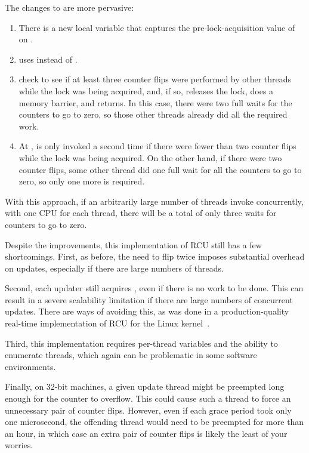 \begin{fcvref}
The changes to  are more pervasive:
\begin{enumerate}
\item	There is a new  local variable that captures
	the pre-lock-acquisition value of  on
	.
\item	{} uses  instead of .
\item	{} check to see if at least three counter flips were
	performed by other threads while the lock was being acquired,
	and, if so, releases the lock, does a memory barrier, and returns.
	In this case, there were two full waits for the counters to
	go to zero, so those other threads already did all the required work.
\item	At ,  is only
	invoked a second time if there were fewer than two counter flips
	while the lock was being acquired.
	On the other hand, if there were two counter flips, some other
	thread did one full wait for all the counters to go to zero,
	so only one more is required.
\end{enumerate}
\end{fcvref}

With this approach, if an arbitrarily large number of threads invoke
 concurrently, with one CPU for each thread, there
will be a total of only three waits for counters to go to zero.

Despite the improvements, this implementation of RCU still
has a few shortcomings.
First, as before, the need to flip  twice imposes substantial
overhead on updates, especially if there are large
numbers of threads.

Second, each updater still acquires , even if there
is no work to be done.
This can result in a severe scalability limitation
if there are large numbers of concurrent updates.
There are ways of avoiding this, as was done in a
production-quality real-time implementation of RCU for the Linux
kernel~\cite{PaulEMcKenney2007PreemptibleRCU}.

Third, this implementation requires per-thread variables
and the ability to enumerate threads, which again can be
problematic in some software environments.

Finally, on 32-bit machines, a given update thread might be
preempted long enough for the 
counter to overflow.
This could cause such a thread to force an unnecessary
pair of counter flips.
However, even if each grace period took only one
microsecond, the offending thread would need to be
preempted for more than an hour, in which case an
extra pair of counter flips is likely the least of
your worries.

